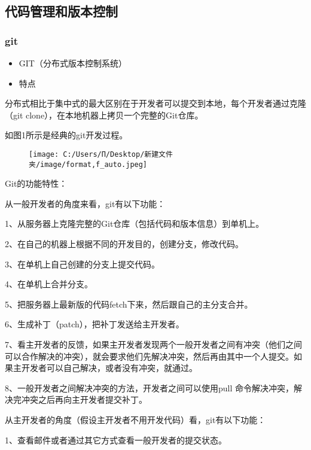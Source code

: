 \documentclass[
]{article}
\begin{document}
\hypertarget{ux4ee3ux7801ux7ba1ux7406ux548cux7248ux672cux63a7ux5236}{%
\subsection{代码管理和版本控制}\label{ux4ee3ux7801ux7ba1ux7406ux548cux7248ux672cux63a7ux5236}}

\hypertarget{git}{%
\subsubsection{git}\label{git}}

\begin{itemize}
\item
  GIT（分布式版本控制系统）
\item
  特点
\end{itemize}

分布式相比于集中式的最大区别在于开发者可以提交到本地，每个开发者通过克隆（git
clone），在本地机器上拷贝一个完整的Git仓库。

如图1所示是经典的git开发过程。

\begin{figure}
\centering
\texttt{[image: C:/Users/Π/Desktop/新建文件夹/image/format,f\_auto.jpeg]}
\caption{}
\end{figure}

Git的功能特性：

从一般开发者的角度来看，git有以下功能：

1、从服务器上克隆完整的Git仓库（包括代码和版本信息）到单机上。

2、在自己的机器上根据不同的开发目的，创建分支，修改代码。

3、在单机上自己创建的分支上提交代码。

4、在单机上合并分支。

5、把服务器上最新版的代码fetch下来，然后跟自己的主分支合并。

6、生成补丁（patch），把补丁发送给主开发者。

7、看主开发者的反馈，如果主开发者发现两个一般开发者之间有冲突（他们之间可以合作解决的冲突），就会要求他们先解决冲突，然后再由其中一个人提交。如果主开发者可以自己解决，或者没有冲突，就通过。

8、一般开发者之间解决冲突的方法，开发者之间可以使用pull
命令解决冲突，解决完冲突之后再向主开发者提交补丁。

从主开发者的角度（假设主开发者不用开发代码）看，git有以下功能：

1、查看邮件或者通过其它方式查看一般开发者的提交状态。
\end{document}
